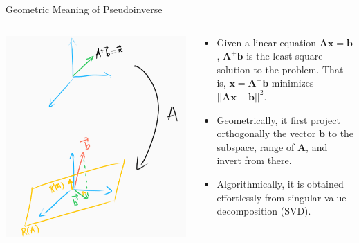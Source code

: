 \documentclass[aspectratio=169]{beamer}
\begin{document}
\begin{frame}{Geometric Meaning of Pseudoinverse}
  \begin{columns}
    \begin{column}{.5\textwidth}
      \includegraphics[width=.85\textwidth]{figures/pseudo_geo.png}
    \end{column}
    \begin{column}{.5\textwidth}
      \begin{itemize}
        \item Given a linear equation $\mathbf{Ax}=\mathbf{b}$, $\mathbf{A}^+\mathbf{b}$ is the least square solution to the problem. That is, $\mathbf{x}=\mathbf{A}^+\mathbf{b}$ minimizes $||\mathbf{Ax}-\mathbf{b}||^2$.
        \item Geometrically, it first project orthogonally the vector $\mathbf{b}$ to the subspace, range of $\mathbf{A}$, and invert from there.
        \item Algorithmically, it is obtained effortlessly from singular value decomposition (SVD).
      \end{itemize}
    \end{column}
  \end{columns}
\end{frame}
\end{document}
